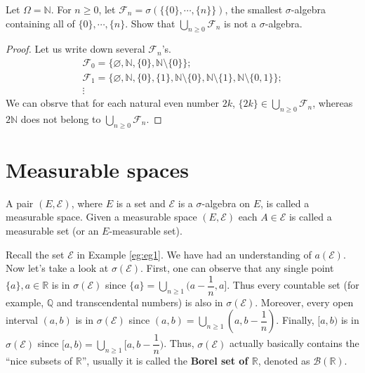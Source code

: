 \documentclass[11pt,singlecolumn, openany, citestyle=authoryear]{elegantbook}
\begin{document}
\begin{CJK}{UTF8}{gbsn}
\begin{exercise}
    Let $\Omega = \mathbb{N}$. For $n \geqslant 0$, let $\mathcal{F}_n=\sigma(\{
        \{0\},\cdots,\{n\}
    \})$, the smallest $\sigma$-algebra containing all of $\{0\},\cdots,\{n\}$.
    Show that $\displaystyle \bigcup_{n \geqslant 0}\mathcal{F}_n$ is not a 
    $\sigma$-algebra.
\end{exercise}
\begin{proof}
    Let us write down several $\mathcal{F}_n$'s.
    \begin{gather*}
        \mathcal{F}_0 = \{\varnothing,\mathbb{N},\{0\},\mathbb{N}\setminus\{0\}\};\\
        \mathcal{F}_1 = \{\varnothing,\mathbb{N},\{0\},\{1\},
        \mathbb{N}\setminus\{0\},\mathbb{N}\setminus\{1\},
        \mathbb{N}\setminus\{0,1\}
        \};\\
        \vdots
    \end{gather*}  
    We can obsrve that for each natural even number $2k$, $\{2k\} \in \displaystyle \bigcup_{n \geqslant 0}\mathcal{F}_n$,
    whereas $2\mathbb{N}$ does not belong to $\displaystyle \bigcup_{n \geqslant 0}\mathcal{F}_n$.
\end{proof}

\section{Measurable spaces}
\begin{definition}
    A pair $(E, \mathcal{E} )$, where $E$ is a set and $\mathcal{E} $ 
    is a $\sigma$-algebra on $E$, is called a measurable space.
Given a measurable space $(E, \mathcal{E} )$ each $A \in \mathcal{E} $ 
is called a measurable set (or an $E$-measurable set). 
\end{definition}
Recall the set $\mathcal{E}$ in Example \ref{eg:eg1}. We have had an understanding of $a(\mathcal{E})$.
Now let's take a look at $\sigma(\mathcal{E})$. First, one can observe that any single
point $\{a\}, a \in \mathbb{R}$ is in $\sigma({\mathcal{E}})$ since $\{a\}=
\displaystyle \bigcup_{n \geq 1}(a-\dfrac{1}{n},a]$. Thus every countable set (for example,
$\mathbb{Q}$ and transcendental numbers) is also in $\sigma(\mathcal{E})$. Moreover, every open interval $(a,b)$ is in 
$\sigma(\mathcal{E})$ since $(a,b)=\displaystyle \bigcup_{n \geqslant 1}(a,b-\dfrac{1}{n})$.
Finally, $[a,b)$ is in $\sigma(\mathcal{E})$ since $[a,b)=
\displaystyle \bigcup_{n \geqslant 1}[a,b-\dfrac{1}{n})$. Thus, $\sigma(\mathcal{E})$ actually
basically contains the ``nice subsets of $\mathbb{R}$'', usually it is called the 
\textbf{Borel set of $\mathbb{R}$}, denoted as $\mathcal{B}(\mathbb{R})$.


\end{CJK}
\end{document}
